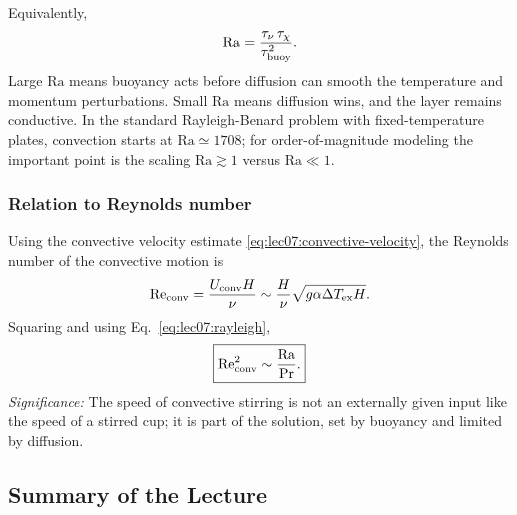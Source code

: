 Equivalently,
\begin{equation}
    \mathrm{Ra}
    = \frac{\tau_\nu\,\tau_\chi}{\tau_{\rm buoy}^2}.
    \label{eq:lec07:rayleigh-timescales}
\end{equation}
Large $\mathrm{Ra}$ means buoyancy acts before diffusion can smooth the
temperature and momentum perturbations. Small $\mathrm{Ra}$ means diffusion
wins, and the layer remains conductive. In the standard Rayleigh-Benard
problem with fixed-temperature plates, convection starts at
$\mathrm{Ra}\simeq1708$; for order-of-magnitude modeling the important point is
the scaling $\mathrm{Ra}\gtrsim 1$ versus $\mathrm{Ra}\ll1$.

\subsubsection*{Relation to Reynolds number}
Using the convective velocity estimate
\eqref{eq:lec07:convective-velocity}, the Reynolds number of the convective
motion is
\begin{equation}
    \mathrm{Re}_{\rm conv}
    = \frac{U_{\rm conv}H}{\nu}
    \sim \frac{H}{\nu}\sqrt{g\alpha\Delta T_{\rm ex}H}.
    \label{eq:lec07:convective-reynolds}
\end{equation}
Squaring and using Eq.~\eqref{eq:lec07:rayleigh},
\begin{equation}
    \boxed{
    \mathrm{Re}_{\rm conv}^2
    \sim \frac{\mathrm{Ra}}{\mathrm{Pr}}.
    }
    \label{eq:lec07:re-ra-pr}
\end{equation}
\textit{Significance:} The speed of convective stirring is not an externally
given input like the speed of a stirred cup; it is part of the solution, set by
buoyancy and limited by diffusion.

\subsection{Summary of the Lecture}
\label{sec:lec07:summary}

